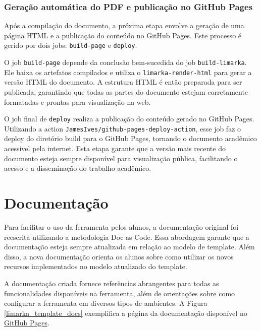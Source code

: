 \documentclass[
	12pt,				%
	oneside,			%
	a4paper,			%
	english,			%
	french,				%
	spanish,			%
	brazil				%
	]{abntex2}
\begin{document}
\hypertarget{gerauxe7uxe3o-automuxe1tica-do-pdf-e-publicauxe7uxe3o-no-github-pages}{%
\subsubsection{Geração automática do PDF e publicação no GitHub
Pages}\label{gerauxe7uxe3o-automuxe1tica-do-pdf-e-publicauxe7uxe3o-no-github-pages}}

Após a compilação do documento, a próxima etapa envolve a geração de uma
página HTML e a publicação do conteúdo no GitHub Pages. Este processo é
gerido por dois jobs: \texttt{build-page} e \texttt{deploy}.

O job \texttt{build-page} depende da conclusão bem-sucedida do job
\texttt{build-limarka}. Ele baixa os artefatos compilados e utiliza o
\texttt{limarka-render-html} para gerar a versão HTML do documento. A
estrutura HTML é então preparada para ser publicada, garantindo que
todas as partes do documento estejam corretamente formatadas e prontas
para visualização na web.

O job final de \texttt{deploy} realiza a publicação do conteúdo gerado
no GitHub Pages. Utilizando a action
\texttt{JamesIves/github-pages-deploy-action}, esse job faz o deploy do
diretório build para o GitHub Pages, tornando o documento acadêmico
acessível pela internet. Esta etapa garante que a versão mais recente do
documento esteja sempre disponível para visualização pública,
facilitando o acesso e a disseminação do trabalho acadêmico.

\hypertarget{documentauxe7uxe3o-1}{%
\section{Documentação}\label{documentauxe7uxe3o-1}}

Para facilitar o uso da ferramenta pelos alunos, a documentação original
foi reescrita utilizando a metodologia Doc as Code. Essa abordagem
garante que a documentação esteja sempre atualizada em relação ao modelo
de template. Além disso, a nova documentação orienta os alunos sobre
como utilizar os novos recursos implementados no modelo atualizado do
template.

A documentação criada fornece referências abrangentes para todas as
funcionalidades disponíveis na ferramenta, além de orientações sobre
como configurar a ferramenta em diversos tipos de ambientes. A Figura
\ref{limarka_template_docs} exemplifica a página da documentação
disponível no
\href{https://reinanhs.github.io/limarka-template-docs}{GitHub Pages}.
\end{document}
